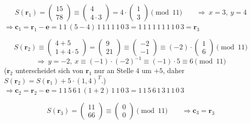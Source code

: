 \begin{loesung}
\[
S(\mathbf{r}_1) = \begin{pmatrix} 15\\ 78 \end{pmatrix} \equiv \begin{pmatrix} 4\\ 4 \cdot 3 \end{pmatrix} = 4 \cdot \begin{pmatrix} 1\\ 3 \end{pmatrix} \pmod{11}
\qquad\Rightarrow\ x = 3,\ y = 4
\]
$\Rightarrow \mathbf{c}_1 = \mathbf{r}_1 - \mathbf{e} = 1\,1\,(5 - 4)\,1\,1\,1\,1\,1\,0\,3 = 1\,1\,1\,1\,1\,1\,1\,1\,0\,3 = \mathbf{r}_3$

\[
S(\mathbf{r}_2) \equiv \begin{pmatrix} 4 + 5\\ 1 + 4 \cdot 5 \end{pmatrix} = \begin{pmatrix} 9\\ 21 \end{pmatrix} \equiv \begin{pmatrix} -2\\ -1 \end{pmatrix} \equiv (-2) \cdot \begin{pmatrix} 1\\ 6 \end{pmatrix} \pmod{11}
\]\[
\Rightarrow\ y = -2,\ x \equiv (-1) \cdot (-2)^{-1} \equiv (-1) \cdot 5 \equiv 6 \pmod{11}
\]
($\mathbf{r}_2$ unterscheidet sich von $\mathbf{r}_1$ nur an Stelle $4$ um $+5$, daher $S(\mathbf{r}_2) = S(\mathbf{r}_1) + 5 \cdot (1, 4)^T$.)
$\Rightarrow \mathbf{c}_2 = \mathbf{r}_2 - \mathbf{e} = 1\,1\,5\,6\,1\,(1 + 2)\,1\,1\,0\,3 = 1\,1\,5\,6\,1\,3\,1\,1\,0\,3$

\[
S(\mathbf{r}_3) = \begin{pmatrix} 11\\ 66 \end{pmatrix} \equiv \begin{pmatrix} 0\\ 0 \end{pmatrix} \pmod{11} \qquad\Rightarrow \mathbf{c}_3 = \mathbf{r}_3
\]
\end{loesung}
